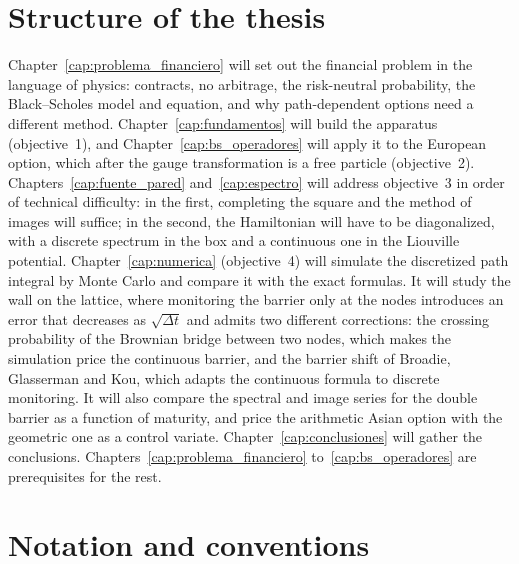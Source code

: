 \section{Structure of the thesis}
\label{sec:estructura_memoria}

Chapter~\ref{cap:problema_financiero} will set out the financial
problem in the language of physics: contracts, no arbitrage, the
risk-neutral probability, the Black--Scholes model and equation, and why
path-dependent options need a different method.
Chapter~\ref{cap:fundamentos} will build the apparatus (objective~1),
and Chapter~\ref{cap:bs_operadores} will apply it to the European
option, which after the gauge transformation is a free particle
(objective~2). Chapters~\ref{cap:fuente_pared} and~\ref{cap:espectro}
will address objective~3 in order of technical difficulty: in the first,
completing the square and the method of images will suffice; in the
second, the Hamiltonian will have to be diagonalized, with a discrete spectrum
in the box and a continuous one in the Liouville potential.
Chapter~\ref{cap:numerica} (objective~4) will simulate the discretized
path integral by Monte Carlo and compare it with the exact formulas. It
will study the wall on the lattice, where monitoring the barrier only at
the nodes introduces an error that decreases as $\sqrt{\Delta t}$ and
admits two different corrections: the crossing probability of the
Brownian bridge between two nodes, which makes the simulation price the
continuous barrier, and the barrier shift of Broadie, Glasserman and
Kou, which adapts the continuous formula to discrete monitoring. It will
also compare the spectral and image series for the double barrier as a
function of maturity, and price the arithmetic Asian option with the
geometric one as a control variate. Chapter~\ref{cap:conclusiones} will
gather the conclusions. Chapters~\ref{cap:problema_financiero}
to~\ref{cap:bs_operadores} are prerequisites for the rest.

\section{Notation and conventions}
\label{sec:notacion_convenios}

